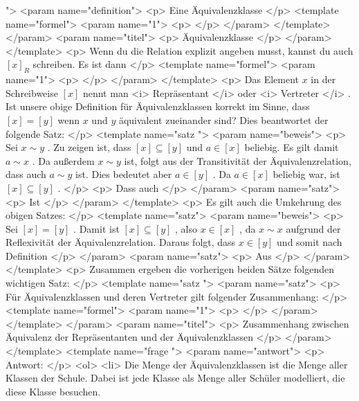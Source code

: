  ">
   <param name="definition">
    <p>
     Eine Äquivalenzklasse
    </p>
    <template name="formel">
     <param name="1">
      <p>
      </p>
     </param>
    </template>
   </param>
   <param name="titel">
    <p>
     Äquivalenzklasse
    </p>
   </param>
  </template>
  <p>
   Wenn du die Relation explizit angeben musst, kannst du auch
   $[x]_R$
   schreiben. Es ist dann
  </p>
  <template name="formel">
   <param name="1">
    <p>
    </p>
   </param>
  </template>
  <p>
   Das Element
   $x$
   in der Schreibweise
   $[x]$
   nennt man
   <i>
    Repräsentant
   </i>
   oder
   <i>
    Vertreter
   </i>
   . Ist unsere obige Definition für Äquivalenzklassen korrekt im Sinne, dass
   $[x]=[y]$
   wenn
   $x$
   und
   $y$
   äquivalent zueinander sind? Dies beantwortet der folgende Satz:
  </p>
  <template name="satz
 ">
   <param name="beweis">
    <p>
     Sei
     $x\sim y$
     . Zu zeigen ist, dass
     $[x]\subseteq [y]$
     und
     $a\in [x]$
     beliebig. Es gilt damit
     $a\sim x$
     . Da außerdem
     $x\sim y$
     ist, folgt aus der Transitivität der Äquivalenzrelation, dass auch
     $a\sim y$
     ist. Dies bedeutet aber
     $a\in [y]$
     . Da
     $a\in [x]$
     beliebig war, ist
     $[x]\subseteq[y]$
     .
    </p>
    <p>
     Dass auch
    </p>
   </param>
   <param name="satz">
    <p>
     Ist
    </p>
   </param>
  </template>
  <p>
   Es gilt auch die Umkehrung des obigen Satzes:
  </p>
  <template name="satz">
   <param name="beweis">
    <p>
     Sei
     $[x]=[y]$
     . Damit ist
     $[x]\subseteq [y]$
     , also
     $x\in[x]$
     , da
     $x\sim x$
     aufgrund der Reflexivität der Äquivalenzrelation. Daraus folgt, dass
     $x\in [y]$
     und somit nach Definition
    </p>
   </param>
   <param name="satz">
    <p>
     Aus
    </p>
   </param>
  </template>
  <p>
   Zusammen ergeben die vorherigen beiden Sätze folgenden wichtigen Satz:
  </p>
  <template name="satz
 ">
   <param name="satz">
    <p>
     Für Äquivalenzklassen und deren Vertreter gilt folgender Zusammenhang:
    </p>
    <template name="formel">
     <param name="1">
      <p>
      </p>
     </param>
    </template>
   </param>
   <param name="titel">
    <p>
     Zusammenhang zwischen Äquivalenz der Repräsentanten und der Äquivalenzklassen
    </p>
   </param>
  </template>
  <template name="frage
 ">
   <param name="antwort">
    <p>
     Antwort:
    </p>
    <ol>
     <li>
      Die Menge der Äquivalenzklassen ist die Menge aller Klassen der Schule. Dabei ist jede Klasse als Menge aller Schüler modelliert, die diese Klasse besuchen.

